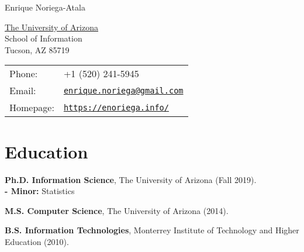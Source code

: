 \documentclass[letterpaper]{article}
\def\name{Enrique Noriega-Atala}
\renewenvironment{itemize}{
  \begin{list}{}{
    \setlength{\leftmargin}{1.5em}
  }
}{
  \end{list}
}
\begin{document}
{\huge \name}


\vspace{0.25in}

\begin{minipage}{0.45\linewidth}
  \href{http://www.unc.edu/}{The University of Arizona} \\
  School of Information \\
  Tucson, AZ 85719
\end{minipage}
\begin{minipage}{0.45\linewidth}
  \begin{tabular}{ll}
    Phone: & +1 (520) 241-5945 \\
    Email: & \href{mailto:enrique.noriega@gmail.com}{\tt enrique.noriega@gmail.com} \\
    Homepage: & \href{https://enoriega.info/}{\tt https://enoriega.info/} \\
  \end{tabular}
\end{minipage}


%


\section*{Education}

\begin{itemize}
  \item \textbf{Ph.D. Information Science}, The University of Arizona (Fall 2019). \\
     \textbf{- Minor:} Statistics
  \item \textbf{M.S. Computer Science}, The University of Arizona (2014).
  \item \textbf{B.S. Information Technologies}, Monterrey Institute of Technology and Higher Education (2010).
\end{itemize}
\end{document}
